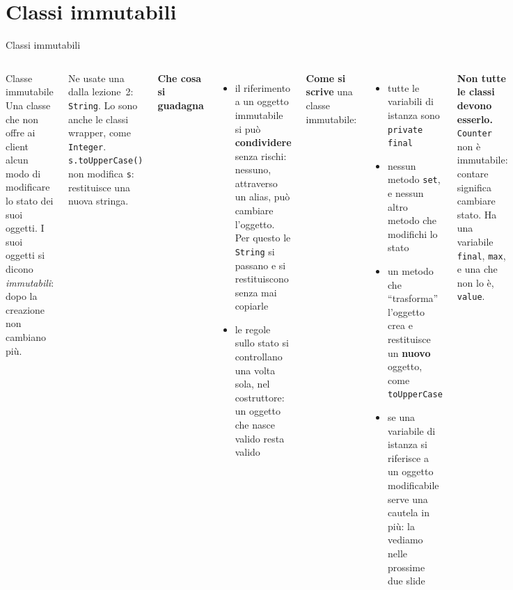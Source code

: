 \documentclass[10pt,aspectratio=169]{beamer}
\begin{document}
\section{Classi immutabili}

\begin{frame}{Classi immutabili}
\begin{columns}[T]
\begin{block}{Classe immutabile}
\small Una classe che non offre ai client alcun modo di modificare lo stato dei suoi oggetti. I suoi oggetti si dicono \emph{immutabili}: dopo la creazione non cambiano più.
\end{block}

\small
Ne usate una dalla lezione~2: \texttt{String}. Lo sono anche le classi wrapper, come \texttt{Integer}. \texttt{s.toUpperCase()} non modifica \texttt{s}: restituisce una nuova stringa.

\vspace{0.1cm}
\textbf{Che cosa si guadagna}
\begin{itemize}\itemsep=3pt
    \item il riferimento a un oggetto immutabile si può \textbf{condividere} senza rischi: nessuno, attraverso un alias, può cambiare l'oggetto. Per questo le \texttt{String} si passano e si restituiscono senza mai copiarle
    \item le regole sullo stato si controllano una volta sola, nel costruttore: un oggetto che nasce valido resta valido
\end{itemize}

\small
\textbf{Come si scrive} una classe immutabile:
\begin{itemize}\itemsep=4pt
    \item tutte le variabili di istanza sono \texttt{private final}
    \item nessun metodo \texttt{set}, e nessun altro metodo che modifichi lo stato
    \item un metodo che ``trasforma'' l'oggetto crea e restituisce un \textbf{nuovo} oggetto, come \texttt{toUpperCase}
    \item se una variabile di istanza si riferisce a un oggetto modificabile serve una cautela in più: la vediamo nelle prossime due slide
\end{itemize}

\vspace{0.25cm}
\textbf{Non tutte le classi devono esserlo.} \texttt{Counter} non è immutabile: contare significa cambiare stato. Ha una variabile \texttt{final}, \texttt{max}, e una che non lo è, \texttt{value}.
\end{columns}
\end{frame}
\end{document}
